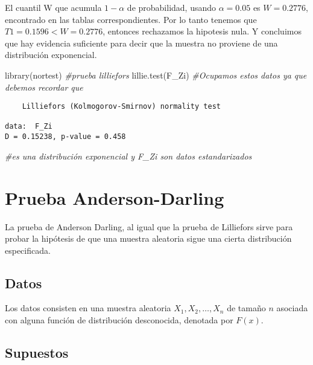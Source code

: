 \documentclass[
  a4paper,
  oneside,
  openany]{book}
\newenvironment{Shaded}{\begin{snugshade}}{\end{snugshade}}
\newcommand{\CommentTok}[1]{\textcolor[rgb]{0.56,0.35,0.01}{\textit{#1}}}
\newcommand{\FunctionTok}[1]{\textcolor[rgb]{0.00,0.00,0.00}{#1}}
\newcommand{\NormalTok}[1]{#1}
\begin{document}
El cuantil W que acumula \(1-\alpha\) de probabilidad, usando \(\alpha=0.05\) es \(W = 0.2776\), encontrado en las tablas correspondientes. Por lo tanto tenemos que \(T1=0.1596 < W=0.2776\), entonces rechazamos la hipotesis nula. Y concluimos que hay evidencia suficiente para decir que la muestra no proviene de una distribución exponencial.

\begin{Shaded}
\begin{Highlighting}[]
\FunctionTok{library}\NormalTok{(nortest) }\CommentTok{\#prueba lilliefors}
\FunctionTok{lillie.test}\NormalTok{(F\_Zi) }\CommentTok{\#Ocupamos estos datos ya que debemos recordar que }
\end{Highlighting}
\end{Shaded}

\begin{verbatim}
    Lilliefors (Kolmogorov-Smirnov) normality test

data:  F_Zi
D = 0.15238, p-value = 0.458
\end{verbatim}

\begin{Shaded}
\begin{Highlighting}[]
                   \CommentTok{\#es una distribución exponencial y F\_Zi son datos estandarizados }
\end{Highlighting}
\end{Shaded}

\hypertarget{prueba-anderson-darling}{%
\chapter{Prueba Anderson-Darling}\label{prueba-anderson-darling}}

La prueba de Anderson Darling, al igual que la prueba de Lilliefors sirve para probar la
hipótesis de que una muestra aleatoria sigue una cierta distribución especificada.

\hypertarget{datos-18}{%
\section{Datos}\label{datos-18}}

Los datos consisten en una muestra aleatoria \(X_{1},X_{2},\ldots,X_{n}\) de tamaño \(n\) asociada con alguna función de distribución desconocida, denotada por \(F(x)\).

\hypertarget{supuestos-16}{%
\section{Supuestos}\label{supuestos-16}}
\end{document}
